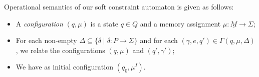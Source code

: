 Operational semantics of our soft constraint automaton is given as follows:

\begin{itemize}
	\item A \emph{configuration} $(q,\mu)$ is a state $q\in Q$ and a memory assignment $\mu:\underline{M}\to\Sigma$;
	\item For each non-empty $\Delta\subseteq\{\delta\mid\delta:P\to\Sigma\}$ and for each $(\gamma,e,q')\in\Gamma(q,\mu,\Delta)$, we relate the configurations $(q,\mu)$ and $(q',\gamma')$;
	\item We have as initial configuration $(q_0,\mu^I)$.
\end{itemize}






